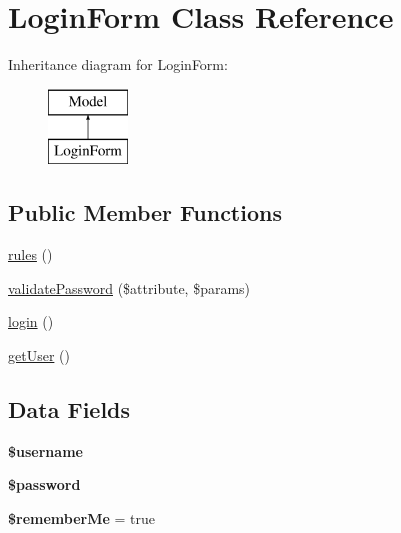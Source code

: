 \hypertarget{classapp_1_1models_1_1_login_form}{}\section{Login\+Form Class Reference}
\label{classapp_1_1models_1_1_login_form}
Inheritance diagram for Login\+Form\+:\begin{figure}[H]
\begin{center}
\leavevmode
\includegraphics[height=2.000000cm]{classapp_1_1models_1_1_login_form}
\end{center}
\end{figure}
\subsection*{Public Member Functions}
\begin{DoxyCompactItemize}
\item 
\hyperlink{classapp_1_1models_1_1_login_form_a17dba92d96b9dd48c62f3ede3eef94d4}{rules} ()
\item 
\hyperlink{classapp_1_1models_1_1_login_form_aa188862aeb325bc1c2be6d8d89893787}{validate\+Password} (\$attribute, \$params)
\item 
\hyperlink{classapp_1_1models_1_1_login_form_aa311da27ba5706f5710cea7706c8eae1}{login} ()
\item 
\hyperlink{classapp_1_1models_1_1_login_form_ae81b7186fb97a7c6457edcc68c9aa2ef}{get\+User} ()
\end{DoxyCompactItemize}
\subsection*{Data Fields}
\begin{DoxyCompactItemize}
\item 
\hypertarget{classapp_1_1models_1_1_login_form_a0eb82aa5f81cf845de4b36cd653c42cf}{}\label{classapp_1_1models_1_1_login_form_a0eb82aa5f81cf845de4b36cd653c42cf} 
{\bfseries \$username}
\item 
\hypertarget{classapp_1_1models_1_1_login_form_a607686ef9f99ea7c42f4f3dd3dbb2b0d}{}\label{classapp_1_1models_1_1_login_form_a607686ef9f99ea7c42f4f3dd3dbb2b0d} 
{\bfseries \$password}
\item 
\hypertarget{classapp_1_1models_1_1_login_form_ad9e6993ef3c93c464ec55f7d7e5d1ac9}{}\label{classapp_1_1models_1_1_login_form_ad9e6993ef3c93c464ec55f7d7e5d1ac9} 
{\bfseries \$remember\+Me} = true
\end{DoxyCompactItemize}


